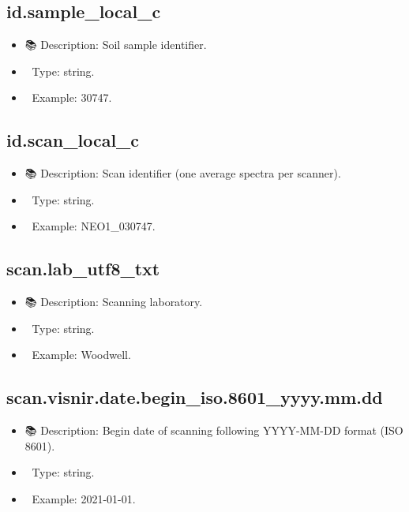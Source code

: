 \documentclass[
  letterpaper,
  DIV=11,
  numbers=noendperiod]{scrreprt}
\providecommand{\tightlist}{%
  \setlength{\itemsep}{0pt}\setlength{\parskip}{0pt}}\usepackage{longtable,booktabs,array}
\begin{document}
\subsection{id.sample\_local\_c}\label{id.sample_local_c}

\begin{itemize}
\tightlist
\item
  📚 Description: Soil sample identifier.
\item
  🔢 Type: string.
\item
  📖 Example: 30747.
\end{itemize}

\subsection{id.scan\_local\_c}\label{id.scan_local_c-2}

\begin{itemize}
\tightlist
\item
  📚 Description: Scan identifier (one average spectra per scanner).
\item
  🔢 Type: string.
\item
  📖 Example: NEO1\_030747.
\end{itemize}

\subsection{scan.lab\_utf8\_txt}\label{scan.lab_utf8_txt}

\begin{itemize}
\tightlist
\item
  📚 Description: Scanning laboratory.
\item
  🔢 Type: string.
\item
  📖 Example: Woodwell.
\end{itemize}

\subsection{scan.visnir.date.begin\_iso.8601\_yyyy.mm.dd}\label{scan.visnir.date.begin_iso.8601_yyyy.mm.dd-1}

\begin{itemize}
\tightlist
\item
  📚 Description: Begin date of scanning following YYYY-MM-DD format
  (ISO 8601).
\item
  🔢 Type: string.
\item
  📖 Example: 2021-01-01.
\end{itemize}
\end{document}
